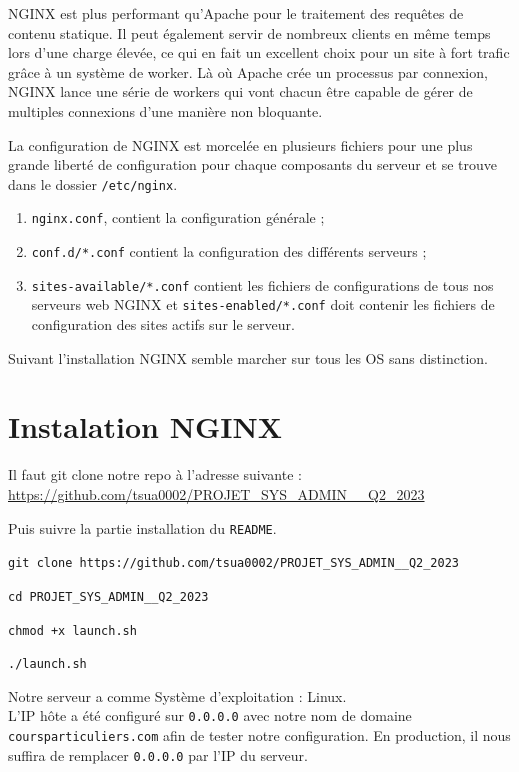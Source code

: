 \documentclass{article}
\begin{document}
NGINX est plus performant qu'Apache pour le traitement des requêtes de contenu statique. Il peut également servir de nombreux clients en même temps lors d'une charge élevée, ce qui en fait un excellent choix pour un site à fort trafic grâce à un système de worker. Là où Apache crée un processus par connexion, NGINX lance une série de workers qui vont chacun être capable de gérer de multiples connexions d'une manière non bloquante.

La configuration de NGINX est morcelée en plusieurs fichiers pour une plus grande liberté de configuration pour chaque composants du serveur et se trouve dans le dossier \texttt{/etc/nginx}.

\begin{enumerate}
    \item \texttt{nginx.conf}, contient la configuration générale ;
    \item \texttt{conf.d/*.conf} contient la configuration des différents serveurs ;
    \item \texttt{sites-available/*.conf} contient les fichiers de configurations de tous nos serveurs web NGINX et \texttt{sites-enabled/*.conf} doit contenir les fichiers de configuration des sites actifs sur le serveur.
    
\end{enumerate}

Suivant l'installation NGINX semble marcher sur tous les OS sans distinction. 



\section{Instalation NGINX}

Il faut git clone notre repo à l'adresse suivante : \url{https://github.com/tsua0002/PROJET\_SYS\_ADMIN\_\_Q2\_2023}

Puis suivre la partie installation du \texttt{README}.

\colorbox{gray!10}{\lstinline{git clone https://github.com/tsua0002/PROJET_SYS_ADMIN__Q2_2023}}


\colorbox{gray!10}{\lstinline{cd PROJET_SYS_ADMIN__Q2_2023}}


\colorbox{gray!10}{\lstinline{chmod +x launch.sh}}


\colorbox{gray!10}{\lstinline{./launch.sh}}

Notre serveur a comme Système d'exploitation : Linux.\\
L'IP hôte a été configuré sur \texttt{0.0.0.0} avec notre nom de domaine \texttt{coursparticuliers.com} afin de tester notre configuration.
En production, il nous suffira de remplacer \texttt{0.0.0.0} par l'IP du serveur.
\end{document}
